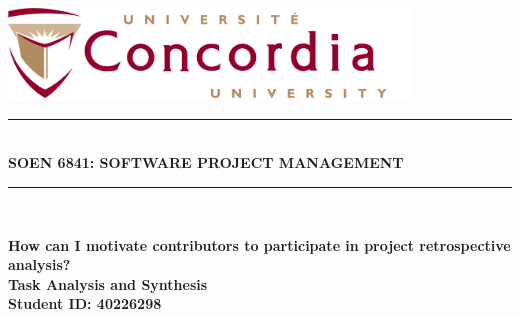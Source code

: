 \begin{titlepage}
\newcommand{\HRule}{\rule{\linewidth}{0.5mm}}                           %
\center


\includegraphics[width=0.8\textwidth]{concordia_logo.png}\\[0.2cm]  %

\HRule \\[0.8cm]
\textbf{\Large SOEN 6841: SOFTWARE PROJECT MANAGEMENT}\\[0.2cm]
\HRule \\
\vfill

\textbf{\Large How can I motivate contributors to
participate in project retrospective
analysis? }\\
\vfill
\textbf{\large Task Analysis and Synthesis \\  Student ID: 40226298 }\\
\vfill


\\
\vfill
\end{titlepage}